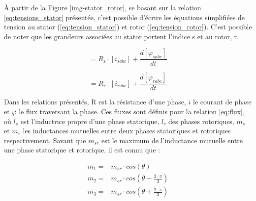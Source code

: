 À partir de la Figure \ref{img-stator_rotor}, se basant sur la relation \ref{eq:tensions_stator} présentée, c'est possible d'écrire les équations simplifiées de tension au stator (\ref{eq:tension_stator}) et rotor (\ref{eq:tension_rotor}). C'est possible de noter que les grandeurs associées au stator portent l'indice s et au rotor, r. 

\begin{equation}
    [v_{sabc}] = R_s \cdot [i_{sabc}] + \frac{d [\varphi_{sabc}]}{dt}
    \label{eq:tension_stator}
\end{equation}

\begin{equation}
    [v_{rabc}] = R_r \cdot [i_{rabc}] + \frac{d [\varphi_{rabc}]}{dt}
    \label{eq:tension_rotor}
\end{equation}

Dans les relations présentés, R est la résistance d'une phase, $i$ le courant de phase et $\varphi$ le flux traversant la phase. Ces fluxes sont définis pour la relation \ref{eq:flux}, où $l_s$ est l'inductrice propre d'une phase statorique, $l_r$ des phases rotoriques, $m_s$ et $m_r$ les inductances mutuelles entre deux phases statoriques et rotoriques respectivement. Savant que $m_{sr}$ est le maximum de l'inductance mutuelle entre une phase statorique et rotorique, il est connu que :

\begin{align*}
    m_1 =& m_{sr} \cdot cos(\theta) \\
    m_2 =& m_{sr} \cdot cos\left( \theta - \frac{2 \cdot \pi}{3} \right) \\
    m_3 =& m_{sr} \cdot cos \left( \theta + \frac{2 \cdot \pi}{3} \right) 
\end{align*}

